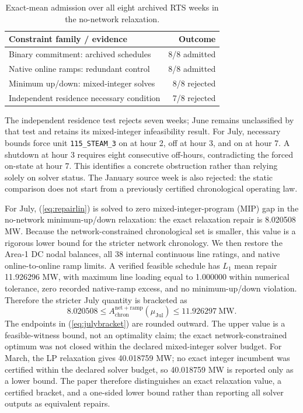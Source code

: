 \documentclass[journal]{IEEEtran}
\begin{document}
\begin{table}[t]
\caption{Exact-mean admission over all eight archived RTS weeks in the no-network relaxation.}
\label{tab:chronadmit}
\centering
\footnotesize
\begin{tabularx}{\columnwidth}{Xr}
\toprule
Constraint family / evidence & Outcome\\
\midrule
Binary commitment: archived schedules & 8/8 admitted\\
Native online ramps: redundant control & 8/8 admitted\\
Minimum up/down: mixed-integer solves & 8/8 rejected\\
Independent residence necessary condition & 7/8 rejected\\
\bottomrule
\end{tabularx}
\end{table}

The independent residence test rejects seven weeks; June remains unclassified by that test and retains its mixed-integer infeasibility result. For July, necessary bounds force unit \texttt{115\_STEAM\_3} on at hour 2, off at hour 3, and on at hour 7. A shutdown at hour 3 requires eight consecutive off-hours, contradicting the forced on-state at hour 7. This identifies a concrete obstruction rather than relying solely on solver status. The January source week is also rejected: the static comparison does not start from a previously certified chronological operating law.

For July, (\ref{eq:repairlin}) is solved to zero mixed-integer-program (MIP) gap in the no-network minimum-up/down relaxation: the exact relaxation repair is 8.020508 MW. Because the network-constrained chronological set is smaller, this value is a rigorous lower bound for the stricter network chronology. We then restore the Area-1 DC nodal balances, all 38 internal continuous line ratings, and native online-to-online ramp limits. A verified feasible schedule has $L_1$ mean repair 11.926296 MW, with maximum line loading equal to 1.000000 within numerical tolerance, zero recorded native-ramp excess, and no minimum-up/down violation. Therefore the stricter July quantity is bracketed as
\begin{equation}
8.020508\le A_{\mathrm{chron}}^{\mathrm{net+ramp}}(\mu_{\mathrm{Jul}})\le 11.926297\ \mathrm{MW}.
\label{eq:julybracket}
\end{equation}
The endpoints in (\ref{eq:julybracket}) are rounded outward. The upper value is a feasible-witness bound, not an optimality claim; the exact network-constrained optimum was not closed within the declared mixed-integer solver budget. For March, the LP relaxation gives 40.018759 MW; no exact integer incumbent was certified within the declared solver budget, so 40.018759 MW is reported only as a lower bound. The paper therefore distinguishes an exact relaxation value, a certified bracket, and a one-sided lower bound rather than reporting all solver outputs as equivalent repairs.
\end{document}
